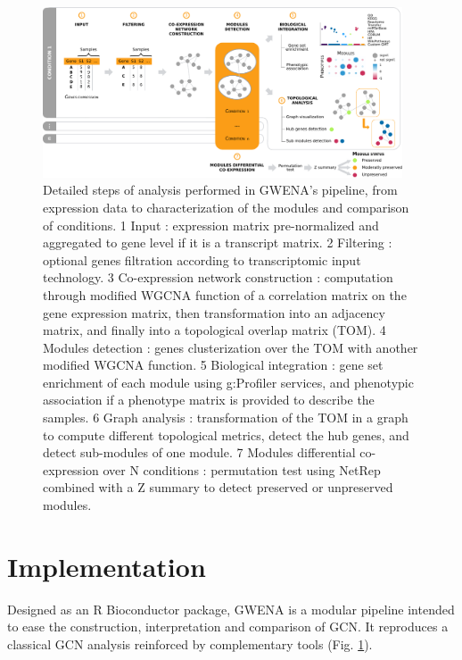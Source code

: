 \begin{figure}[ht]
    \centering
    \includegraphics[width=0.95\textwidth]{img/chap1/figure_1.pdf}
    \caption[Detailed steps of analysis performed in GWENA's pipeline]{Detailed steps of analysis performed in GWENA's pipeline, from expression data to characterization of the modules and comparison of conditions. \textcircled{\small{1}} Input : expression matrix pre-normalized and aggregated to gene level if it is a transcript matrix. \textcircled{\small{2}} Filtering : optional genes filtration according to transcriptomic input technology. \textcircled{\small{3}} Co-expression network construction : computation through modified WGCNA function of a correlation matrix on the gene expression matrix, then transformation into an adjacency matrix, and finally into a topological overlap matrix (TOM). \textcircled{\small{4}} Modules detection : genes clusterization over the TOM with another modified WGCNA function. \textcircled{\small{5}} Biological integration : gene set enrichment of each module using g:Profiler services, and phenotypic association if a phenotype matrix is provided to describe the samples. \textcircled{\small{6}} Graph analysis : transformation of the TOM in a graph to compute different topological metrics, detect the hub genes, and detect sub-modules of one module. \textcircled{\small{7}} Modules differential co-expression over N conditions : permutation test using NetRep combined with a Z summary to detect preserved or unpreserved modules.} 
    \label{fig:fig_pipeline_schema}
\end{figure}


\section{Implementation}

Designed as an R Bioconductor package, GWENA is a modular pipeline intended to ease the construction, interpretation and comparison of GCN. It reproduces a classical GCN analysis reinforced by complementary tools (Fig. \ref{fig:fig_pipeline_schema}). 


